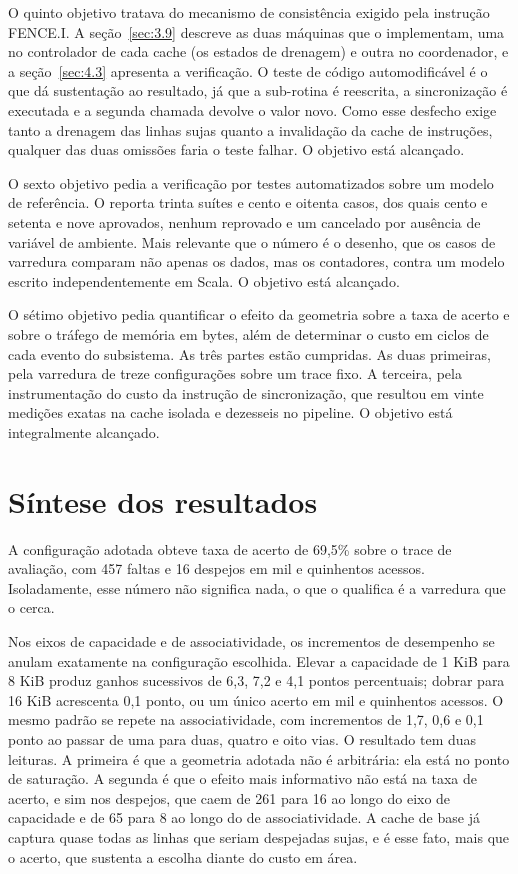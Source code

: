 O quinto objetivo tratava do mecanismo de consistência exigido pela instrução FENCE.I. A seção~\ref{sec:3.9} descreve as duas máquinas que o implementam, uma no controlador de cada cache (os estados de drenagem) e outra no coordenador, e a seção~\ref{sec:4.3} apresenta a verificação. O teste de código automodificável é o que dá sustentação ao resultado, já que a sub-rotina é reescrita, a sincronização é executada e a segunda chamada devolve o valor novo. Como esse desfecho exige tanto a drenagem das linhas sujas quanto a invalidação da cache de instruções, qualquer das duas omissões faria o teste falhar. O objetivo está alcançado.

O sexto objetivo pedia a verificação por testes automatizados sobre um modelo de referência. O  reporta trinta suítes e cento e oitenta casos, dos quais cento e setenta e nove aprovados, nenhum reprovado e um cancelado por ausência de variável de ambiente. Mais relevante que o número é o desenho, que os casos de varredura comparam não apenas os dados, mas os contadores, contra um modelo escrito independentemente em Scala. O objetivo está alcançado.

O sétimo objetivo pedia quantificar o efeito da geometria sobre a taxa de acerto e sobre o tráfego de memória em bytes, além de determinar o custo em ciclos de cada evento do subsistema. As três partes estão cumpridas. As duas primeiras, pela varredura de treze configurações sobre um trace fixo. A terceira, pela instrumentação do custo da instrução de sincronização, que resultou em vinte medições exatas na cache isolada e dezesseis no pipeline. O objetivo está integralmente alcançado.

\section{Síntese dos resultados}\label{sec:5.2}

A configuração adotada obteve taxa de acerto de 69,5\% sobre o trace de avaliação, com 457 faltas e 16 despejos em mil e quinhentos acessos. Isoladamente, esse número não significa nada, o que o qualifica é a varredura que o cerca.

Nos eixos de capacidade e de associatividade, os incrementos de desempenho se anulam exatamente na configuração escolhida. Elevar a capacidade de 1 KiB para 8 KiB produz ganhos sucessivos de 6,3, 7,2 e 4,1 pontos percentuais; dobrar para 16 KiB acrescenta 0,1 ponto, ou um único acerto em mil e quinhentos acessos. O mesmo padrão se repete na associatividade, com incrementos de 1,7, 0,6 e 0,1 ponto ao passar de uma para duas, quatro e oito vias. O resultado tem duas leituras. A primeira é que a geometria adotada não é arbitrária: ela está no ponto de saturação. A segunda é que o efeito mais informativo não está na taxa de acerto, e sim nos despejos, que caem de 261 para 16 ao longo do eixo de capacidade e de 65 para 8 ao longo do de associatividade. A cache de base já captura quase todas as linhas que seriam despejadas sujas, e é esse fato, mais que o acerto, que sustenta a escolha diante do custo em área.

